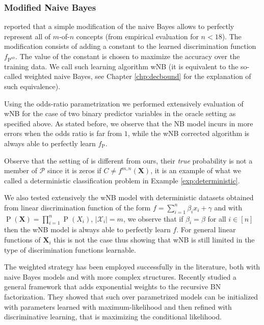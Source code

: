 \documentclass[11pt,a4paper, twoside]{book}
\newcommand{\Pp}{\operatorname{P}}
\newcommand{\bX}{\mathbf{X}}
\newcommand{\nchi}{\mathcal{X}}
\begin{document}
\subsubsection{Modified Naive Bayes}
\cite{Domingos97} reported that a simple modification of the naive Bayes allows to perfectly represent all of $m$-of-$n$ concepts (from empirical evaluation for $n<18$). The modification consists of adding a constant to the learned discrimination function $f_{\Pp^{nb}}$. The value of the constant is chosen to maximize the accuracy over the training data. We call such learning algorithm wNB (it is equivalent to the so-called weighted naive Bayes, see Chapter \ref{chp:decbound} for the explanation of such equivalence).

Using the odds-ratio parametrization we performed extensively evaluation of wNB for the case of two binary predictor variables in the oracle setting as specified above. As stated before, we observe that the NB model incurs in more errors when the odds ratio is far from $1$, while the wNB corrected algorithm is always able to perfectly learn $f_{\Pp}$. 

Observe that the setting of \cite{Domingos97} is different from ours, their \textit{true} probability is not a member of $\mathcal{P}$ since it is zeros if $C \neq f^{m,n}(\bX)$, it is an example of what we called a deterministic classification problem in Example \ref{exp:deterministic}.

We also tested extensively the wNB model with deterministic datasets obtained from linear discrimination function  of the form $f = \sum_{i=1}^{n} \beta_i x_i + \gamma$ and with $\Pp(\bX)=\prod_{i=1}^{n} \Pp(X_i)$, $|\nchi_i|=m$, we observe that if $\beta_i = \beta$ for all $i \in [n]$ then the wNB model is always able to perfectly learn $f$. For general linear functions of $\bX_i$ this is not the case thus showing that wNB is still limited in the type of discrimination functions learnable.

The weighted strategy has been employed successfully in the literature, both with naive Bayes models and with more complex structures. Recently \cite{Zaidi2017} studied a general framework that adds exponential weights to the recursive BN factorization. They showed that such over parametrized  models can be initialized with parameters learned with maximum-likelihood and then refined with discriminative learning, that is maximizing the conditional likelihood.
\end{document}
